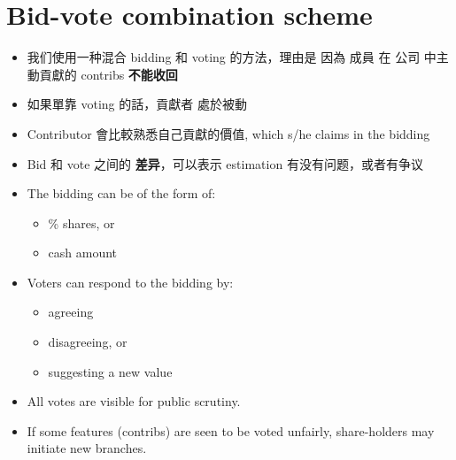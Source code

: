 \documentclass[12pt, orivec]{article}
\newcommand{\cc}[2]{#1}
\newcommand{\cc}[2]{#2}
\begin{document}
\secttoc
\section{Bid-vote combination scheme}

\begin{itemize}
	\item \cc{
	我们使用一种混合 bidding 和 voting 的方法，理由是 因為 成員 在 公司 中主動貢獻的 contribs \textbf{不能收回}}{
	We consider a mixed voting-bidding scheme, the rationale being that a member's voluntary contribution cannot be \textbf{retracted}
	}
	
	\item \cc{
	如果單靠 voting 的話，貢獻者 處於被動}{
	If we rely solely on voting, contributors are in a passive position
	}

	\item \cc{
	Contributor 會比較熟悉自己貢獻的價值, which s/he claims in the bidding}{
	Contributors would be more in touch with the value of their own contributions, which s/he claims in the bidding
	}
	
	\item \cc{
	Bid 和 vote 之间的 \textbf{差异}，可以表示 estimation 有没有问题，或者有争议}{
	If there is a big difference between bid and voted values, it may indicate an inaccurate assessment or a disagreement.
	}

	\item The bidding can be of the form of:
	\begin{itemize}
		\item \% shares, or
		\item cash amount
	\end{itemize}

	\item Voters can respond to the bidding by:
	\begin{itemize}
		\item agreeing
		\item disagreeing, or
		\item suggesting a new value
	\end{itemize}


	\item All votes are visible for public scrutiny.

	\item If some features (contribs) are seen to be voted unfairly, share-holders may initiate new branches.
\end{itemize}
\end{document}
